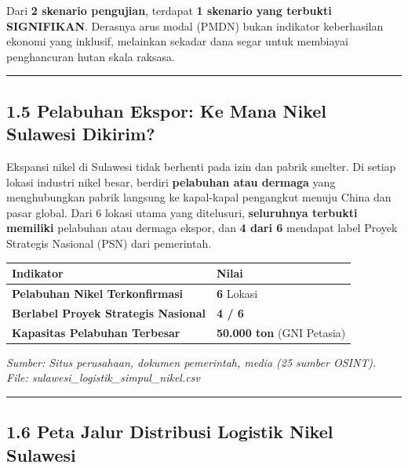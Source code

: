 \documentclass[
]{article}
\newcounter{none} %
\begin{document}
Dari \textbf{2 skenario pengujian}, terdapat \textbf{1 skenario yang
terbukti SIGNIFIKAN}. Derasnya arus modal (PMDN) bukan indikator
keberhasilan ekonomi yang inklusif, melainkan sekadar dana segar untuk
membiayai penghancuran hutan skala raksasa.

\begin{center}\rule{0.5\linewidth}{0.5pt}\end{center}

\subsection{1.5 Pelabuhan Ekspor: Ke Mana Nikel Sulawesi
Dikirim?}\label{pelabuhan-ekspor-ke-mana-nikel-sulawesi-dikirim}

Ekspansi nikel di Sulawesi tidak berhenti pada izin dan pabrik smelter.
Di setiap lokasi industri nikel besar, berdiri \textbf{pelabuhan atau
dermaga} yang menghubungkan pabrik langsung ke kapal-kapal pengangkut
menuju China dan pasar global. Dari 6 lokasi utama yang ditelusuri,
\textbf{seluruhnya terbukti memiliki} pelabuhan atau dermaga ekspor, dan
\textbf{4 dari 6} mendapat label Proyek Strategis Nasional (PSN) dari
pemerintah.

{\def\LTcaptype{none} %
\begin{longtable}[]{@{}ll@{}}
\toprule\noalign{}
Indikator & Nilai \\
\midrule\noalign{}
\endhead
\bottomrule\noalign{}
\endlastfoot
\textbf{Pelabuhan Nikel Terkonfirmasi} & \textbf{6} Lokasi \\
\textbf{Berlabel Proyek Strategis Nasional} & \textbf{4 / 6} \\
\textbf{Kapasitas Pelabuhan Terbesar} & \textbf{50.000 ton} (GNI
Petasia) \\
\end{longtable}
}

\emph{Sumber: Situs perusahaan, dokumen pemerintah, media (25 sumber
OSINT). File: sulawesi\_logistik\_simpul\_nikel.csv}

\begin{center}\rule{0.5\linewidth}{0.5pt}\end{center}

\subsection{1.6 Peta Jalur Distribusi Logistik Nikel
Sulawesi}\label{peta-jalur-distribusi-logistik-nikel-sulawesi}
\end{document}
